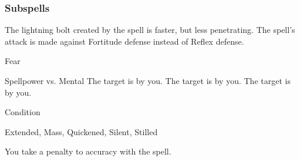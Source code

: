 \subsubsection{Subspells}
The lightning bolt created by the spell is faster, but less penetrating.
The spell's attack is made against Fortitude defense instead of Reflex defense.
\begin{spellsection}{Fear}
\begin{spellheader}
\end{spellheader}
\begin{spellcontent}
\begin{spelltargetinginfo}
\end{spelltargetinginfo}
\begin{spelleffects}
\begin{spellattack}{Spellpower vs. Mental}
\spellsuccess The target is \frightened by you.
\spellcritical The target is \panicked by you.
\spellfailure The target is \shaken by you.
\end{spellattack}
\spelldur Condition
\end{spelleffects}
\end{spellcontent}
\begin{spellfooter}
 Extended, Mass, Quickened, Silent, Stilled
\end{spellfooter}
\begin{spellsubcontent}
\begin{spellcantrip}
You take a  penalty to accuracy with the spell.
\end{spellcantrip}
\end{spellsubcontent}
\end{spellsection}
